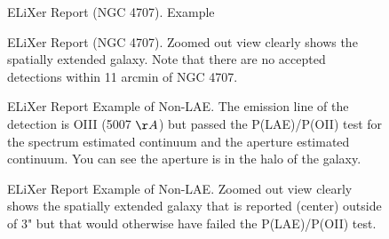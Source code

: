 \documentclass{aastex62}
\begin{document}
\begin{figure}[H]
\caption{ELiXer Report (NGC 4707). Example \label{fig:elixer_ngc_4707}}
\end{figure}

\begin{figure}[H]
\caption{ELiXer Report (NGC 4707). Zoomed out view clearly shows the spatially extended galaxy. Note that there are no accepted detections within 11 arcmin of NGC 4707.\label{fig:elixer_ngc_4707_wide}}
\end{figure}


\begin{figure}[H]
\caption{ELiXer Report Example of Non-LAE. The emission line of the detection is OIII (5007 $\AA$) but passed the P(LAE)/P(OII) test for the spectrum estimated continuum and the aperture estimated continuum. You can see the aperture is in the halo of the galaxy. \label{fig:elixer_not_lae}}
\end{figure}

\begin{figure}[H]
\caption{ELiXer Report Example of Non-LAE. Zoomed out view clearly shows the spatially extended galaxy that is reported (center) outside of 3" but that would otherwise have failed the P(LAE)/P(OII) test.\label{fig:elixer_not_lae_wide}}
\end{figure}
\end{document}
